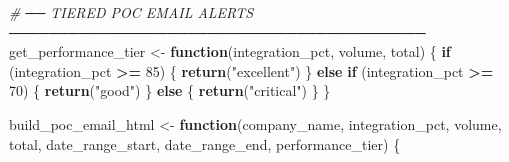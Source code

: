 \documentclass[
]{article}
\newenvironment{Shaded}{\begin{snugshade}}{\end{snugshade}}
\newcommand{\CommentTok}[1]{\textcolor[rgb]{0.56,0.35,0.01}{\textit{#1}}}
\newcommand{\ControlFlowTok}[1]{\textcolor[rgb]{0.13,0.29,0.53}{\textbf{#1}}}
\newcommand{\DecValTok}[1]{\textcolor[rgb]{0.00,0.00,0.81}{#1}}
\newcommand{\FunctionTok}[1]{\textcolor[rgb]{0.13,0.29,0.53}{\textbf{#1}}}
\newcommand{\NormalTok}[1]{#1}
\newcommand{\OtherTok}[1]{\textcolor[rgb]{0.56,0.35,0.01}{#1}}
\newcommand{\SpecialCharTok}[1]{\textcolor[rgb]{0.81,0.36,0.00}{\textbf{#1}}}
\newcommand{\StringTok}[1]{\textcolor[rgb]{0.31,0.60,0.02}{#1}}
\begin{document}
\begin{Shaded}
\begin{Highlighting}[]
    \CommentTok{\# ── TIERED POC EMAIL ALERTS ──────────────────────────────────────────}
\NormalTok{    get\_performance\_tier }\OtherTok{\textless{}{-}} \ControlFlowTok{function}\NormalTok{(integration\_pct, volume, total) \{}
      \ControlFlowTok{if}\NormalTok{ (integration\_pct }\SpecialCharTok{\textgreater{}=} \DecValTok{85}\NormalTok{) \{}
        \FunctionTok{return}\NormalTok{(}\StringTok{"excellent"}\NormalTok{)}
\NormalTok{      \} }\ControlFlowTok{else} \ControlFlowTok{if}\NormalTok{ (integration\_pct }\SpecialCharTok{\textgreater{}=} \DecValTok{70}\NormalTok{) \{}
        \FunctionTok{return}\NormalTok{(}\StringTok{"good"}\NormalTok{)}
\NormalTok{      \} }\ControlFlowTok{else}\NormalTok{ \{}
        \FunctionTok{return}\NormalTok{(}\StringTok{"critical"}\NormalTok{)}
\NormalTok{      \}}
\NormalTok{    \}}
    
\NormalTok{    build\_poc\_email\_html }\OtherTok{\textless{}{-}} \ControlFlowTok{function}\NormalTok{(company\_name, integration\_pct, volume, total,}
\NormalTok{                                     date\_range\_start, date\_range\_end, performance\_tier) \{}
      

\end{Highlighting}
\end{Shaded}
\end{document}
